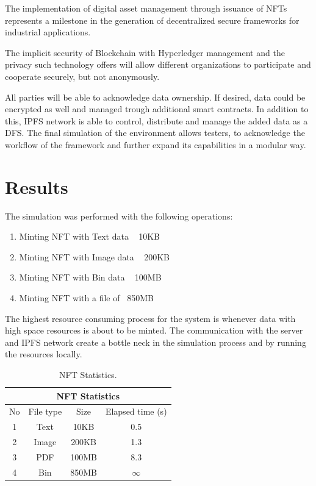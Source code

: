 \documentclass[a4paper]{article}
\begin{document}
The implementation of digital asset management through issuance of NFTs represents a milestone in the generation of decentralized secure frameworks for industrial applications.

The implicit security of Blockchain with Hyperledger management and the privacy such technology offers will allow different organizations to participate and cooperate securely, but not anonymously. 

All parties will be able to acknowledge data ownership. If desired, data could be encrypted as well and managed trough additional smart contracts. In addition to this, IPFS network is able to control, distribute and manage the added data as a DFS. The final simulation of the environment allows testers, to acknowledge the workflow of the framework and further expand its capabilities in a modular way.

\section{Results}
The simulation was performed with the following operations:

\begin{enumerate}
    \item Minting NFT with Text data ~ 10KB
    \item Minting NFT with Image data ~ 200KB
    \item Minting NFT with Bin data ~ 100MB
    \item Minting NFT with a file of ~850MB
\end{enumerate}

The highest resource consuming process for the system is whenever data with high space resources is about to be minted. The communication with the server and IPFS network create a bottle neck in the simulation process and by running the resources locally.

\begin{table}[ht]
\begin{center}
\begin{tabular}{ |c|c|c|c|  }
 \hline
 \multicolumn{4}{|c|}{NFT Statistics} \\
 \hline
 No & File type & Size  & Elapsed time (s)\\
 \hline
 1   & Text     & 10KB &   0.5  \\
 2   & Image    & 200KB &   1.3 \\
 3   & PDF      & 100MB &   8.3 \\
 4   & Bin      & 850MB &   $\infty$ \\
 
 \hline
\end{tabular}
\caption{NFT Statistics.}
\label{table:NFTStats}
\end{center}
\end{table}
\end{document}

